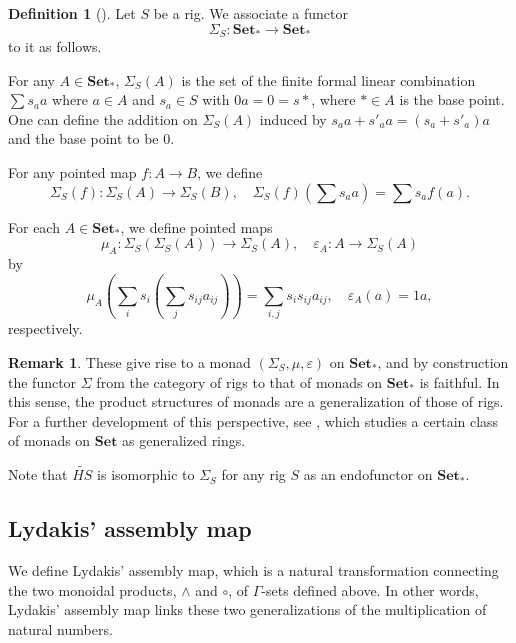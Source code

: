 \documentclass{article}
\numberwithin{equation}{section}
\theoremstyle{definition}
\newtheorem{definition}[thm]{Definition}
\newtheorem{rem}[thm]{Remark}
\begin{document}
\begin{definition}[\cite{CC}] Let $S$ be a rig. We associate a functor
\[\Sigma_{S}:\mathbf{Set}_*\to\mathbf{Set}_*\]
to it as follows.

For any $A\in\mathbf{Set}_*$, $\Sigma_{S}(A)$ is the set of the finite formal linear combination $\sum s_a a$ where $a\in A$ and $s_a\in S$ with $0a=0=s*$, where $*\in A$ is the base point.
One can define the addition on $\Sigma_{S}(A)$ induced by $s_aa+s'_aa=(s_a+s'_a)a$ and the base point to be $0$.

For any pointed map $f:A\to B$, we define \[\Sigma_{S}(f):\Sigma_{S}(A)\to\Sigma_{S}(B), \quad \Sigma_{S}(f)(\sum s_a a)=\sum s_a f(a).\]

For each $A\in\mathbf{Set}_*$, we define pointed maps
\[
\mu_A\colon
\Sigma_S(\Sigma_S(A))
\longrightarrow
\Sigma_S(A), \quad
\varepsilon_A\colon
A\longrightarrow
\Sigma_S(A)
\]
by
\[
\mu_A\left(
\sum_i s_i
\left(\sum_j s_{ij}a_{ij}\right)
\right)
=
\sum_{i,j}s_i s_{ij}a_{ij}, \quad
\varepsilon_A(a)=1a,
\]
respectively.
\end{definition}













\begin{rem} 
These give rise to a monad $(\Sigma_S, \mu, \varepsilon)$ on $\mathbf{Set}_*$, and by construction the functor $\Sigma$ from the category of rigs to that of monads on $\mathbf{Set}_*$ is faithful. 
In this sense, the product structures of monads are a generalization of those of rigs.
For a further development of this perspective, see \cite{Durov}, which studies a certain class of monads on $\mathbf{Set}$ as generalized rings.

Note that $\widetilde{HS}$ is isomorphic to $\Sigma_{S}$ for any rig $S$ as an endofunctor on $\mathbf{Set}_*$.
\end{rem}












\subsection{Lydakis' assembly map}
We define Lydakis' assembly map, which is a natural transformation connecting the two monoidal products, $\wedge$ and $\circ$, of $\Gamma$-sets defined above.
In other words, Lydakis' assembly map links these two generalizations of the multiplication of natural numbers.
\end{document}
